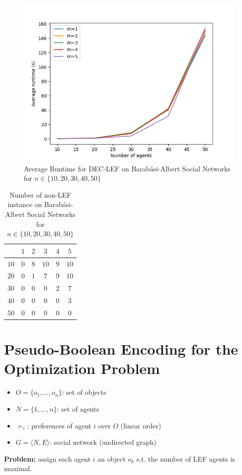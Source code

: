 \documentclass{article}
\begin{document}
\begin{figure}[htb]
\centering
\includegraphics[width=0.5\linewidth]{results-runtime-BA.png}
\caption{Average Runtime for DEC-LEF on Barab\'asi-Albert Social Networks for $n \in \{10,20,30,40,50\}$\label{fig:runtime-barabasi-albert}}
\end{figure}

\begin{table}[htb]
\centering
\begin{tabular}{|c|c|c|c|c|c|}
	\hline
	\backslashbox{$n$}{$m$} & $1$ & $2$ & $3$ & $4$ & $5$ \\ \hline
	$10$ & $0$ & $8$ & $10$ & $9$ & $10$ \\
	$20$ & $0$ & $1$ & $7$ & $9$ & $10$ \\
	$30$ & $0$ & $0$ & $0$ & $2$ & $7$ \\
	$40$ & $0$ & $0$ & $0$ & $0$ & $3$ \\
	$50$ & $0$ & $0$ & $0$ & $0$ & $0$ \\
	\hline
\end{tabular}
\caption{Number of non-LEF instance on Barab\'asi-Albert Social Networks for $n \in \{10,20,30,40,50\}$\label{tab:non-lef-barabasi-albert}}
\end{table}

\section{Pseudo-Boolean Encoding for the Optimization Problem}
\begin{itemize}
	\item $O = \{o_1, \dots, o_n\}$: set of objects
	\item $N = \{1,\dots,n\}$: set of agents
	\item $\succ_i$: preferences of agent $i$ over $O$ (linear order)
	\item $G = \langle N, E\rangle$: social network (undirected graph)
\end{itemize}
{\bf Problem:} assign each agent $i$ an object $o_k$ s.t. the number of LEF agents is maximal.
\end{document}
